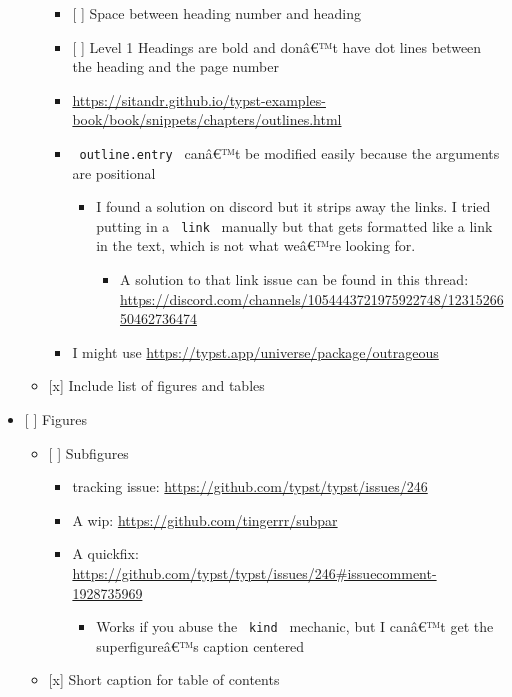 \begin{itemize}
\begin{itemize}
    \begin{itemize}
    \tightlist
    \item
      {[} {]} Space between heading number and heading
    \item
      {[} {]} Level 1 Headings are bold and donâ€™t have dot lines
      between the heading and the page number
    \item
      \url{https://sitandr.github.io/typst-examples-book/book/snippets/chapters/outlines.html}
    \item
      \texttt{\ outline.entry\ } canâ€™t be modified easily because the
      arguments are positional

      \begin{itemize}
      \tightlist
      \item
        I found a solution on discord but it strips away the links. I
        tried putting in a \texttt{\ link\ } manually but that gets
        formatted like a link in the text, which is not what weâ€™re
        looking for.

        \begin{itemize}
        \tightlist
        \item
          A solution to that link issue can be found in this thread:
          \url{https://discord.com/channels/1054443721975922748/1231526650462736474}
        \end{itemize}
      \end{itemize}
    \item
      I might use \url{https://typst.app/universe/package/outrageous}
    \end{itemize}
  \item
    {[}x{]} Include list of figures and tables
  \end{itemize}
\item
  {[} {]} Figures

  \begin{itemize}
  \tightlist
  \item
    {[} {]} Subfigures

    \begin{itemize}
    \tightlist
    \item
      tracking issue: \url{https://github.com/typst/typst/issues/246}
    \item
      A wip: \url{https://github.com/tingerrr/subpar}
    \item
      A quickfix:
      \url{https://github.com/typst/typst/issues/246\#issuecomment-1928735969}

      \begin{itemize}
      \tightlist
      \item
        Works if you abuse the \texttt{\ kind\ } mechanic, but I canâ€™t
        get the superfigureâ€™s caption centered
      \end{itemize}
    \end{itemize}
  \item
    {[}x{]} Short caption for table of contents


\end{itemize}
\end{itemize}
